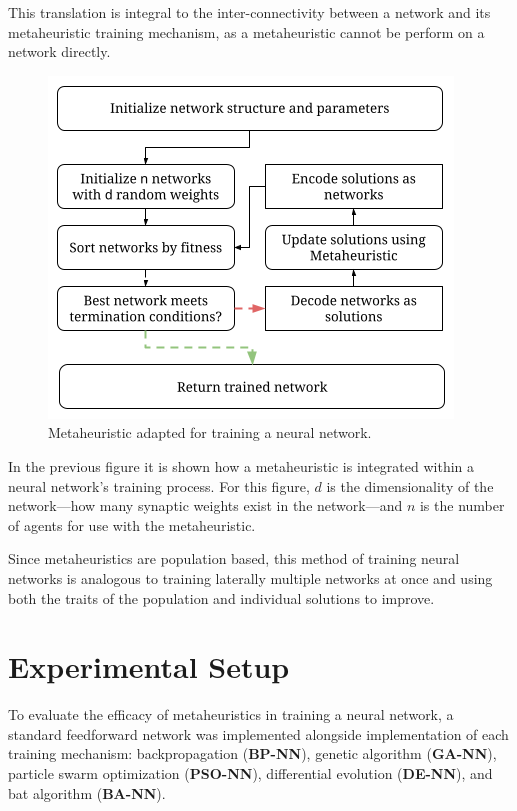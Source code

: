 \documentclass[a4paper,12pt]{article}
\begin{document}
This translation is integral to the inter-connectivity between a network and its metaheuristic training mechanism, as a metaheuristic cannot be perform on a network directly.

\begin{figure}[h!]
\centering
\includegraphics[scale=0.75]{images/training-visualization.png}
\caption{Metaheuristic adapted for training a neural network.}
\label{fig:training-vis}
\end{figure}

In the previous figure it is shown how a metaheuristic is integrated within a neural network's training process. For this figure, $d$ is the dimensionality of the network---how many synaptic weights exist in the network---and $n$ is the number of agents for use with the metaheuristic.

Since metaheuristics are population based, this method of training neural networks is analogous to training laterally multiple networks at once and using both the traits of the population and individual solutions to improve.

\section{Experimental Setup}

To evaluate the efficacy of metaheuristics in training a neural network, a standard feedforward network was implemented alongside implementation of each training mechanism: backpropagation (\textbf{BP-NN}), genetic algorithm (\textbf{GA-NN}), particle swarm optimization (\textbf{PSO-NN}), differential evolution (\textbf{DE-NN}), and bat algorithm (\textbf{BA-NN}).
\end{document}
